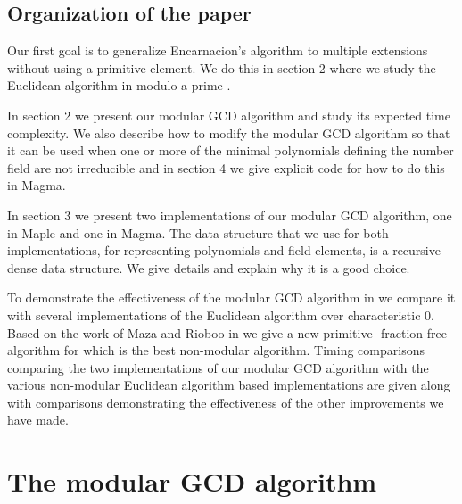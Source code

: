 \documentclass[10pt]{article}
\begin{document}
\subsection{Organization of the paper}
Our first goal is to generalize Encarnacion's algorithm to multiple
extensions without using a primitive element.
We do this in section 2 where we study the Euclidean algorithm in 
modulo a prime .


In section 2 we present our modular GCD algorithm and study its expected
time complexity.  We also describe how to modify the modular GCD algorithm so that it can
be used when one or more of the minimal polynomials defining
the number field  are not irreducible and in section 4 we give
explicit code for how to do this in Magma.


In section 3 we present two implementations of our modular GCD algorithm,
one in Maple and one in Magma.  The data structure that we use for both
implementations, for representing polynomials and field elements, is
a recursive dense data structure.
We give details and explain why it is a good choice.

To demonstrate the effectiveness of the modular GCD algorithm in
 we compare it with several implementations of the Euclidean
algorithm over characteristic 0.  Based on the work of Maza and
Rioboo in \cite{Maza} we give a new primitive -fraction-free
algorithm for  which is the best non-modular algorithm. Timing
comparisons comparing the two implementations of our modular GCD
algorithm with the various non-modular Euclidean algorithm based
implementations are given along with comparisons demonstrating the
effectiveness of the other improvements we have made.


\section{The modular GCD algorithm}
\end{document}
